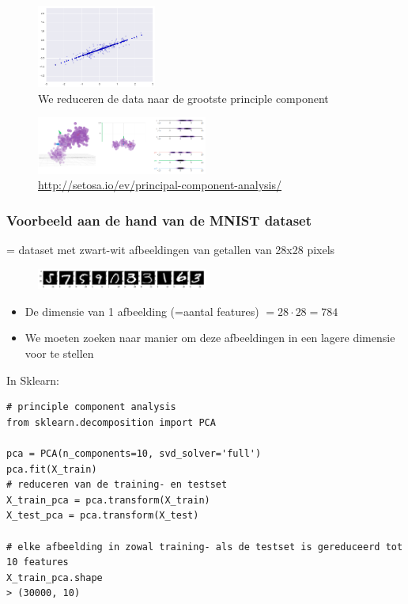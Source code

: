 \documentclass{article}
\begin{document}
\begin{figure}[H]
    \centering
    \includegraphics[width=0.35\textwidth]{pca3.png}
    \caption{We reduceren de data naar de grootste principle component}
\end{figure}

\begin{figure}[H]
    \centering
    \includegraphics[width=0.5\textwidth]{pca4.png}
    \caption{\url{http://setosa.io/ev/principal-component-analysis/}}
\end{figure}

\subsubsection{Voorbeeld aan de hand van de MNIST dataset}

= dataset met zwart-wit afbeeldingen van getallen van 28x28 pixels

\begin{figure}[H]
    \centering
    \includegraphics[width=0.5\textwidth]{mnist.png}
\end{figure}

\begin{itemize}
    \item De dimensie van 1 afbeelding (=aantal features) $= 28\cdot 28 = 784$
    \item We moeten zoeken naar manier om deze afbeeldingen in een lagere dimensie voor te stellen
\end{itemize}

In Sklearn:

\begin{verbatim}
# principle component analysis
from sklearn.decomposition import PCA

pca = PCA(n_components=10, svd_solver='full')
pca.fit(X_train)
# reduceren van de training- en testset
X_train_pca = pca.transform(X_train)
X_test_pca = pca.transform(X_test)

# elke afbeelding in zowal training- als de testset is gereduceerd tot 10 features
X_train_pca.shape
> (30000, 10)
\end{verbatim}
\end{document}
